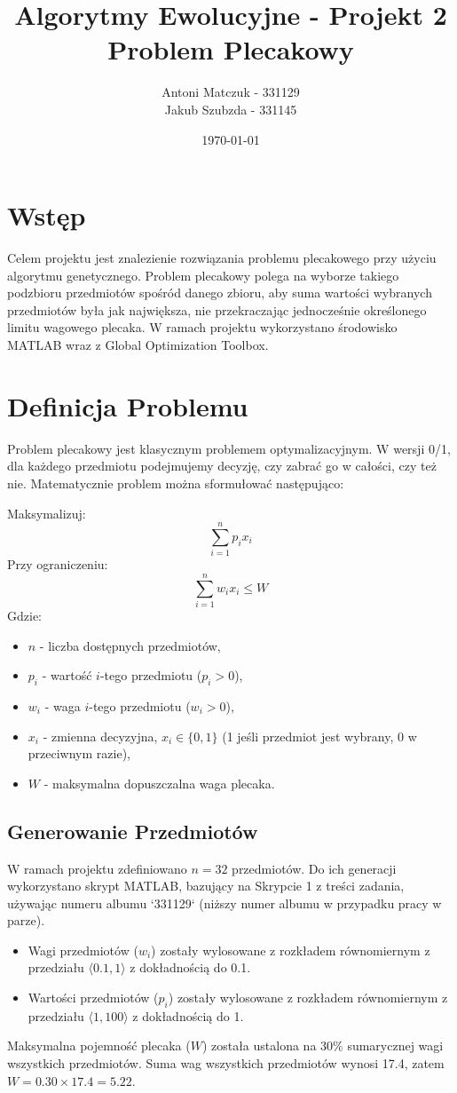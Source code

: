 \documentclass[a4paper, 11pt]{article}
\title{Algorytmy Ewolucyjne - Projekt 2 \\ Problem Plecakowy}
\author{Antoni Matczuk - 331129 \\ Jakub Szubzda - 331145} %
\date{\today}
\begin{document}
\maketitle
\newpage

\tableofcontents
\newpage

\section{Wstęp}
Celem projektu jest znalezienie rozwiązania problemu plecakowego przy użyciu algorytmu genetycznego. Problem plecakowy polega na wyborze takiego podzbioru przedmiotów spośród danego zbioru, aby suma wartości wybranych przedmiotów była jak największa, nie przekraczając jednocześnie określonego limitu wagowego plecaka. W ramach projektu wykorzystano środowisko MATLAB wraz z Global Optimization Toolbox.

\section{Definicja Problemu}
Problem plecakowy jest klasycznym problemem optymalizacyjnym. W wersji 0/1, dla każdego przedmiotu podejmujemy decyzję, czy zabrać go w całości, czy też nie. Matematycznie problem można sformułować następująco:

Maksymalizuj:
\[ \sum_{i=1}^{n} p_i x_i \]
Przy ograniczeniu:
\[ \sum_{i=1}^{n} w_i x_i \leq W \]
Gdzie:
\begin{itemize}
    \item $n$ - liczba dostępnych przedmiotów,
    \item $p_i$ - wartość $i$-tego przedmiotu ($p_i > 0$),
    \item $w_i$ - waga $i$-tego przedmiotu ($w_i > 0$),
    \item $x_i$ - zmienna decyzyjna, $x_i \in \{0, 1\}$ (1 jeśli przedmiot jest wybrany, 0 w przeciwnym razie),
    \item $W$ - maksymalna dopuszczalna waga plecaka.
\end{itemize}

\subsection{Generowanie Przedmiotów}
W ramach projektu zdefiniowano $n=32$ przedmiotów. Do ich generacji wykorzystano skrypt MATLAB, bazujący na Skrypcie 1 z treści zadania, używając numeru albumu `331129` (niższy numer albumu w przypadku pracy w parze).
\begin{itemize}
    \item Wagi przedmiotów ($w_i$) zostały wylosowane z rozkładem równomiernym z przedziału $\langle0.1, 1\rangle$ z dokładnością do 0.1.
    \item Wartości przedmiotów ($p_i$) zostały wylosowane z rozkładem równomiernym z przedziału $\langle1, 100\rangle$ z dokładnością do 1.
\end{itemize}
Maksymalna pojemność plecaka ($W$) została ustalona na 30\% sumarycznej wagi wszystkich przedmiotów. Suma wag wszystkich przedmiotów wynosi 17.4, zatem $W = 0.30 \times 17.4 = 5.22$.
\end{document}
